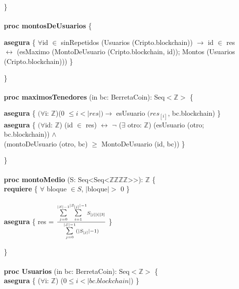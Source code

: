 \documentclass{article}
\newcommand{\Entero}{$\mathds{Z}$}
\begin{document}
    \}\\\\

    \textbf{proc montosDeUsuarios} \{

        \indent\indent \textbf{asegura} \{ $\forall$id $\in$ sinRepetidos (Usuarios (Cripto.blockchain)) $\rightarrow$ id $\in$ res\\
        \indent\indent\indent\indent\indent $\longleftrightarrow$ (esMaximo (MontoDeUsuario (Cripto.blockchain, id));
                                            Montos (Usuarios (Cripto.blockchain))) \}

    \}\\\\

    \textbf{proc maximosTenedores} (in bc: BerretaCoin): Seq$<$\Entero$>$ \{

        \indent\indent\textbf{asegura} \{ $(\forall$i: \Entero)(0 $\le i < |res|) \rightarrow$
                                            esUsuario $(res_{[i]}$, bc.blockchain) \}\\

        \indent\indent\textbf{asegura} \{ $(\forall$id: \Entero) (id $\in$ res) $\longleftrightarrow$
                                         $\neg$ ($\exists$ otro: \Entero) (esUsuario (otro; bc.blockchain)) $\land$\\
        \indent\indent\indent\indent\indent (montoDeUsuario (otro, bc) $\ge$ MontoDeUsuario (id, bc)) \}

    \}\\\\

    \textbf{proc montoMedio} 
    (S: Seq\textless Seq\textless$\mathds{Z}$\texttimes$\mathds{Z}$\texttimes$\mathds{Z}$\texttimes$\mathds{Z}$\textgreater\textgreater): $\mathds{Z}$ \{\\
        \indent\indent \textbf{requiere} \{ $\forall$ bloque $\in S$, $|$bloque$| >$ 0 \}\\\\
        \indent\indent \textbf{asegura} \{ res = $\frac{\mathlarger\sum\limits_{j=0}^{|S|-1} \mathlarger\sum\limits_{i=1}^{|S_{[j]}|-1} S_{[j][i][3]}}{\mathlarger\sum\limits_{j=0}^{|S|-1} (|S_{[j]}|-1)}$ \}

    \}\\\\

    \textbf{proc Usuarios} (in bc: BerretaCoin): Seq$<$\Entero$>$ \{\\
        \indent\indent \textbf{asegura} \{ ($\forall$i: \Entero) ($0 \le i < |bc.blockchain|$) \}\\
\end{document}
